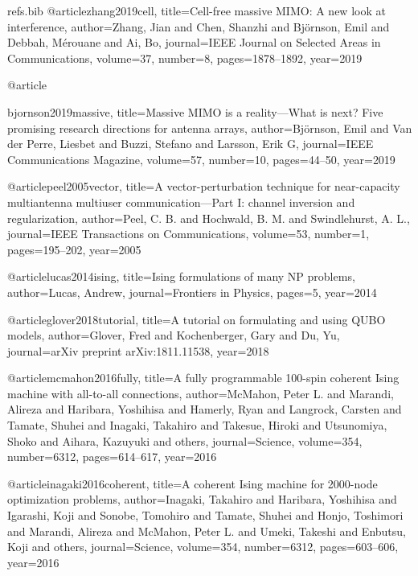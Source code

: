 \begin{filecontents*}{refs.bib}
@article{zhang2019cell,
  title={Cell-free massive MIMO: A new look at interference},
  author={Zhang, Jian and Chen, Shanzhi and Bj{\"o}rnson, Emil and Debbah, M{\'e}rouane and Ai, Bo},
  journal={IEEE Journal on Selected Areas in Communications},
  volume={37},
  number={8},
  pages={1878--1892},
  year={2019}
}

@article{bjornson2019massive,
  title={Massive MIMO is a reality—What is next? Five promising research directions for antenna arrays},
  author={Bj{\"o}rnson, Emil and Van der Perre, Liesbet and Buzzi, Stefano and Larsson, Erik G},
  journal={IEEE Communications Magazine},
  volume={57},
  number={10},
  pages={44--50},
  year={2019}
\usepackage{float} %
}

@article{peel2005vector,
  title={A vector-perturbation technique for near-capacity multiantenna multiuser communication—Part I: channel inversion and regularization},
  author={Peel, C. B. and Hochwald, B. M. and Swindlehurst, A. L.},
  journal={IEEE Transactions on Communications},
  volume={53},
  number={1},
  pages={195--202},
  year={2005}
}

@article{lucas2014ising,
  title={Ising formulations of many NP problems},
  author={Lucas, Andrew},
  journal={Frontiers in Physics},
  pages={5},
  year={2014}
}

@article{glover2018tutorial,
  title={A tutorial on formulating and using QUBO models},
  author={Glover, Fred and Kochenberger, Gary and Du, Yu},
  journal={arXiv preprint arXiv:1811.11538},
  year={2018}
}

@article{mcmahon2016fully,
  title={A fully programmable 100-spin coherent Ising machine with all-to-all connections},
  author={McMahon, Peter L. and Marandi, Alireza and Haribara, Yoshihisa and Hamerly, Ryan and Langrock, Carsten and Tamate, Shuhei and Inagaki, Takahiro and Takesue, Hiroki and Utsunomiya, Shoko and Aihara, Kazuyuki and others},
  journal={Science},
  volume={354},
  number={6312},
  pages={614--617},
  year={2016}
}

@article{inagaki2016coherent,
  title={A coherent Ising machine for 2000-node optimization problems},
  author={Inagaki, Takahiro and Haribara, Yoshihisa and Igarashi, Koji and Sonobe, Tomohiro and Tamate, Shuhei and Honjo, Toshimori and Marandi, Alireza and McMahon, Peter L. and Umeki, Takeshi and Enbutsu, Koji and others},
  journal={Science},
  volume={354},
  number={6312},
  pages={603--606},
  year={2016}
}


\end{filecontents*}
